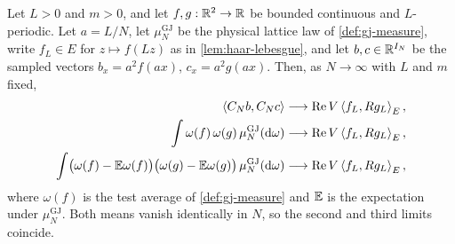 \begin{theorem}\label{thm:covariance-limit}
Let $L>0$ and $m>0$, and let $f,g:\mathbb{R}^2\to\mathbb{R}$ be bounded continuous and
$L$-periodic. Let $a=L/N$, let $\mu^{\mathrm{GJ}}_N$ be the physical lattice law
of \cref{def:gj-measure}, write $f_L\in E$ for $z\mapsto f(Lz)$ as in
\cref{lem:haar-lebesgue}, and let $b,c\in\mathbb{R}^{I_N}$ be the sampled vectors
$b_x=a^2f(ax)$, $c_x=a^2g(ax)$. Then, as $N\to\infty$ with $L$ and $m$ fixed,
\begin{equation}\label{eq:three-limits}
  \begin{aligned}
    \left\langle C_Nb, C_Nc \right\rangle&\longrightarrow\operatorname{Re} V\left\langle f_L, Rg_L \right\rangle_E,\\
    \int\omega(f)\,\omega(g)\,\mu^{\mathrm{GJ}}_N(\mathrm{d}\omega)
      &\longrightarrow\operatorname{Re} V\left\langle f_L, Rg_L \right\rangle_E,\\
    \int\bigl(\omega(f)-\mathbb{E}\omega(f)\bigr)
         \bigl(\omega(g)-\mathbb{E}\omega(g)\bigr)\,\mu^{\mathrm{GJ}}_N(\mathrm{d}\omega)
      &\longrightarrow\operatorname{Re} V\left\langle f_L, Rg_L \right\rangle_E,
  \end{aligned}
\end{equation}
where $\omega(f)$ is the test average of \cref{def:gj-measure} and $\mathbb{E}$ is the
expectation under $\mu^{\mathrm{GJ}}_N$. Both means vanish identically in $N$, so
the second and third limits coincide.
\end{theorem}

